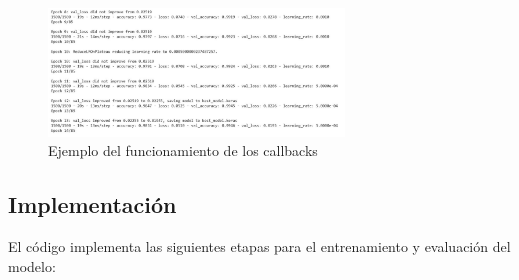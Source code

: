 \begin{figure}[H]
	\centering
	\includegraphics[width=0.7\textwidth]{imgs/explain-callbacks.JPG}
	\caption{Ejemplo del funcionamiento de los callbacks}
	\label{fig:explain-callbacks}
\end{figure}

\subsection{Implementación}

El código implementa las siguientes etapas para el entrenamiento y evaluación del modelo:

